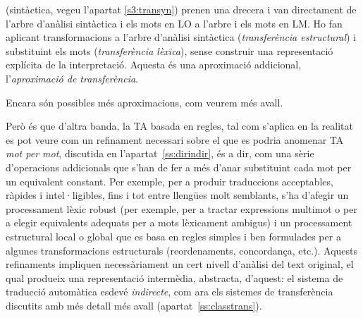 \begin{description}
    (sintàctica, vegeu l'apartat \ref{s3:transyn}) prenen una drecera
    i van directament de l'arbre d'anàlisi sintàctica i els mots en LO
    a l'arbre i els mots en LM. Ho fan aplicant transformacions a
    l'arbre d'anàlisi sintàctica (\emph{transferència estructural}) i
    substituint els mots (\emph{transferència lèxica}), sense
    construir una representació explícita de la interpretació. Aquesta
    és una aproximació addicional, l'\emph{aproximació de
      transferència}.
\end{description}
Encara són possibles més aproximacions, com veurem més avall.

Però és que d'altra banda, la TA basada en regles, tal com s'aplica en
la realitat es pot veure com un refinament necessari sobre el que es
podria anomenar TA \emph{mot per mot}, discutida en
l'apartat~\ref{ss:dirindir}, és a dir, com una sèrie d'operacions
addicionals que s'han de fer a més d'anar substituint cada mot per un
equivalent constant.  Per exemple, per a produir traduccions
acceptables, ràpides i intel·ligibles, fins i tot entre llengües molt
semblants, s'ha d'afegir un processament lèxic robust (per exemple,
per a tractar expressions multimot o per a elegir equivalents adequats
per a mots lèxicament ambigus) i un processament estructural local o
global que es basa en regles simples i ben formulades per a algunes
transformacions estructurals (reordenaments, concordança,
etc.). Aquests refinaments impliquen necessàriament un cert nivell
d'anàlisi del text original, el qual produeix una representació
intermèdia, abstracta, d'aquest: el sistema de traducció automàtica
esdevé \emph{indirecte}, com ara els sistemes de transferència
discutits amb més detall més avall (apartat~\ref{ss:classtrans}). 

